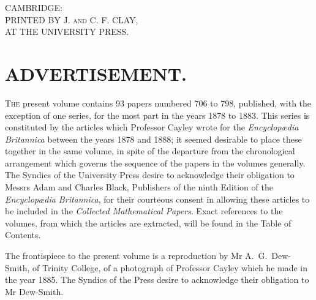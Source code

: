 \documentclass[12pt,a4paper,oneside]{book}
\begin{document}
\thispagestyle{empty}
\null
\clearpage


\thispagestyle{empty}
\null
\vspace*{\fill}
\begin{center}
{\small CAMBRIDGE:\\
PRINTED BY J. \textsc{and} C. F. CLAY,\\
AT THE UNIVERSITY PRESS.}
\end{center}
\vspace*{\fill}
\clearpage

\setcounter{page}{5}

\chapter*{ADVERTISEMENT.}

\textsc{The} present volume contains 93 papers numbered 706 to 798, published, with the exception of one series, for the most part in the years 1878 to 1883. This series is constituted by the articles which Professor Cayley wrote for the \textit{Encyclop\ae{}dia Britannica} between the years 1878 and 1888; it seemed desirable to place these together in the same volume, in spite of the departure from the chronological arrangement which governs the sequence of the papers in the volumes generally. The Syndics of the University Press desire to acknowledge their obligation to Messrs Adam and Charles Black, Publishers of the ninth Edition of the \textit{Encyclop\ae{}dia Britannica}, for their courteous consent in allowing these articles to be included in the \textit{Collected Mathematical Papers}. Exact references to the volumes, from which the articles are extracted, will be found in the Table of Contents.

\medskip

The frontispiece to the present volume is a reproduction by Mr A.~G.~Dew-Smith, of Trinity College, of a photograph of Professor Cayley which he made in the year 1885. The Syndics of the Press desire to acknowledge their obligation to Mr Dew-Smith.
\end{document}
